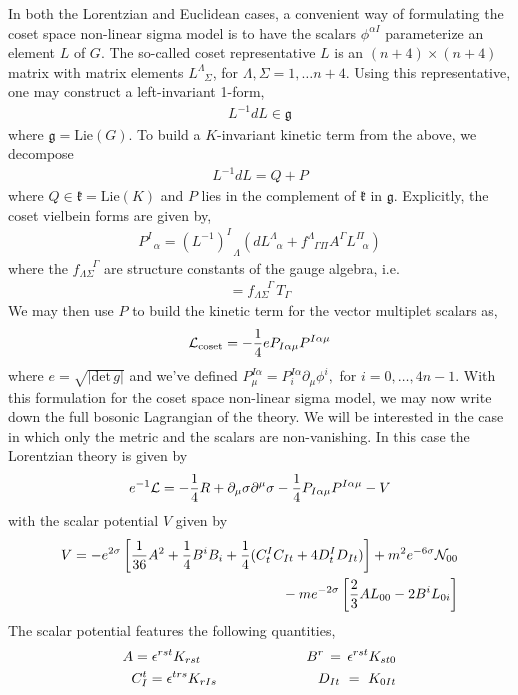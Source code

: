 \documentclass[12pt]{article}
\begin{document}
In both the Lorentzian and Euclidean cases, a convenient way of formulating the coset space non-linear sigma model is to have the scalars $\phi^{\alpha I}$ parameterize an element $L$ of $G$. The so-called coset representative $L$ is an $(n+4)\times(n+4)$ matrix with matrix elements $L^\Lambda_{\,\,\,\,\Sigma}$, for  $\Lambda, \Sigma = 1, \dots n+4$. Using this representative, one may construct a left-invariant 1-form, 
\begin{eqnarray}
L^{-1} d L \in \mathfrak{g}
\end{eqnarray}
where $\mathfrak{g} = \mathrm{Lie}(G)$. To build a $K$-invariant kinetic term from the above, we decompose
\begin{eqnarray}
L^{-1} d L = Q + P
\end{eqnarray}
where $Q \in \mathfrak{k} = \mathrm{Lie}(K)$ and $P$ lies in the complement of $\mathfrak{k}$ in $\mathfrak{g}$.  Explicitly, the coset vielbein forms are  given by, 
\begin{eqnarray}
P^I_{\,\,\,\,\alpha} = \left(L^{-1}\right)^I_{\,\,\,\,\Lambda} \left(d L^\Lambda_{\,\,\,\,\alpha} + f^\Lambda_{\,\,\,\,\Gamma \Pi} A^\Gamma L^\Pi_{\,\,\,\,\alpha} \right)
\end{eqnarray}
where the $f_{\Lambda \Sigma}^{\,\,\,\,\,\,\,\,\Gamma}$ are structure constants of the gauge algebra, i.e.
\begin{eqnarray}
[T_\Lambda, T_\Sigma] =  f_{\Lambda \Sigma}^{\,\,\,\,\,\,\,\,\Gamma} \, T_\Gamma
\end{eqnarray}
We may then use $P$ to build the kinetic term for the vector multiplet scalars as, 
\begin{eqnarray}
{\cal L}_{\mathrm{coset}} = -{1\over 4} e P_{I \alpha \mu} P^{I \alpha \mu}
\end{eqnarray}
where $e = \sqrt{|\mathrm{det} \,g|}$ and we've defined $P_\mu^{I \alpha} = P_i^{I \alpha} \partial_\mu \phi^i,$ for $i = 0, \dots, 4n-1$.  With this formulation for the coset space non-linear sigma model, we may now write down the full bosonic Lagrangian of the theory. We will be interested in the case in which only the metric and the scalars are non-vanishing. In this case the Lorentzian theory is given by
 \begin{eqnarray}
 e^{-1} {\cal L} = -{1 \over 4} R + \partial_\mu \sigma \partial^\mu \sigma - {1\over 4} P_{I \alpha \mu} P^{I \alpha \mu} - V
 \end{eqnarray}
 with the scalar potential $V$ given by 
 \begin{eqnarray}
V = -e^{2 \sigma} \left[ {1 \over 36} A^2 + {1 \over 4}B^i B_i + {1 \over 4} (C^I_t C_{I t} + 4 D^I_t D_{I t}) \right] + m^2 e^{-6 \sigma} {\cal N}_{00} 
\nonumber\\
\vphantom{.} \hspace{0.5in} - m e^{- 2 \sigma} \left[{2 \over 3} A L_{00} - 2 B^i L_{0 i} \right]
\end{eqnarray} 
The scalar potential features the following quantities, 
\begin{eqnarray}
A = \epsilon^{r s t} K_{r s t} \hspace{1 in}\,\,B^r\, = \,\epsilon^{r s t} K_{s t 0}
\nonumber\\
C_I^t = \epsilon^{t r s} K_{r I s} \hspace{1 in} D_{I t}\,\, = \,\, K_{0 I t}
\end{eqnarray}

 
\end{document}
